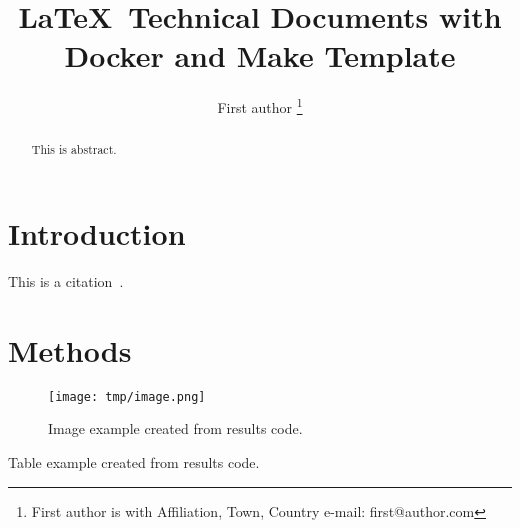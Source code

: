 \documentclass{article}
\begin{document}

\title{\LaTeX\ Technical Documents with Docker and Make Template}

\author{First author
\thanks{First author is with Affiliation, Town, Country e-mail: first@author.com}}

\maketitle

\begin{abstract}
	This is abstract.
\end{abstract}

\section{Introduction}
This is a citation~\cite{author2000title}.

\section{Methods}

\begin{figure}
	\texttt{[image: tmp/image.png]}
	\caption{Image example created from results code.}
	\label{fig:image}
\end{figure}

\begin{table}
	\centering
	\caption{Table example created from results code.}
	\label{table:table}
	\setlength\tabcolsep{4.2pt}
	
\end{table}



\end{document}
